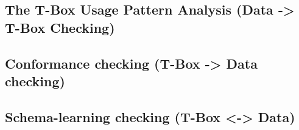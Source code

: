 
\subsection{The T-Box Usage Pattern Analysis (Data -> T-Box Checking)}



\subsection{Conformance checking (T-Box -> Data checking)}


\subsection{Schema-learning checking (T-Box <-> Data)}


